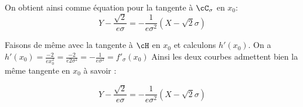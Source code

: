 \begin{correction}
\begin{enumerate}
\begin{enumerate}
On obtient ainsi comme équation pour la tangente à $\cC_\sigma$ en $x_0$:
$$Y- \frac{\sqrt{2}}{e\sigma} = - \frac{1}{e\sigma^2} (X- \sqrt{2}\sigma)$$

Faisons de même avec la tangente à $\cH$ en $x_0$ et calculons $h'(x_0)$. 
On  a $h'(x_0) =\frac{-2}{ex_0^2}= \frac{-2}{e 2 \sigma^2} =- \frac{1}{e\sigma^2} =f'_\sigma(x_0) $
Ainsi les deux courbes admettent bien la même tangente en $x_0$ à savoir :

$$Y- \frac{\sqrt{2}}{e\sigma} = - \frac{1}{e\sigma^2} (X- \sqrt{2}\sigma)$$

 
\end{enumerate}
\end{enumerate}
\end{correction}